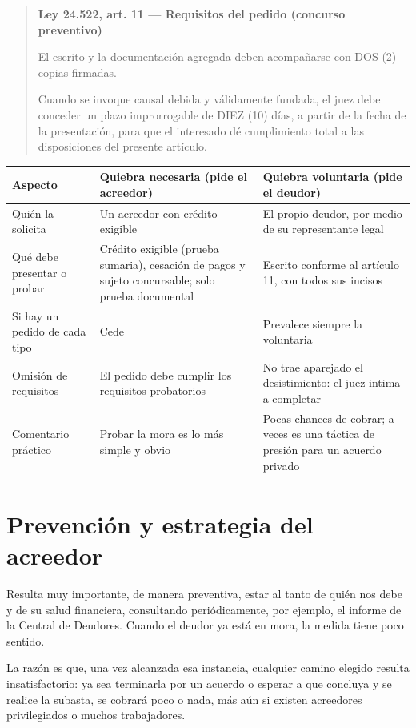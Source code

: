 \documentclass[12pt,oneside]{book}
\newenvironment{articulo}[1]
  {\begin{quote}\small\textbf{#1}\par\smallskip}
  {\end{quote}}
\begin{document}
\begin{articulo}{Ley 24.522, art. 11 --- Requisitos del pedido (concurso preventivo)}
El escrito y la documentación agregada deben acompañarse con DOS (2) copias firmadas.

Cuando se invoque causal debida y válidamente fundada, el juez debe conceder un plazo improrrogable de DIEZ (10) días, a partir de la fecha de la presentación, para que el interesado dé cumplimiento total a las disposiciones del presente artículo.
\end{articulo}

\begin{table}[H]
\centering
\small
\begin{tabularx}{\textwidth}{>{\raggedright\arraybackslash}p{} >{\raggedright\arraybackslash}X >{\raggedright\arraybackslash}X}
\toprule
\textbf{Aspecto} & \textbf{Quiebra necesaria (pide el acreedor)} & \textbf{Quiebra voluntaria (pide el deudor)} \\
\midrule
Quién la solicita & Un acreedor con crédito exigible & El propio deudor, por medio de su representante legal \\
Qué debe presentar o probar & Crédito exigible (prueba sumaria), cesación de pagos y sujeto concursable; solo prueba documental & Escrito conforme al artículo 11, con todos sus incisos \\
Si hay un pedido de cada tipo & Cede & Prevalece siempre la voluntaria \\
Omisión de requisitos & El pedido debe cumplir los requisitos probatorios & No trae aparejado el desistimiento: el juez intima a completar \\
Comentario práctico & Probar la mora es lo más simple y obvio & Pocas chances de cobrar; a veces es una táctica de presión para un acuerdo privado \\
\bottomrule
\end{tabularx}
\end{table}

\section{Prevención y estrategia del acreedor}

Resulta muy importante, de manera preventiva, estar al tanto de quién nos debe y de su salud financiera, consultando periódicamente, por ejemplo, el informe de la Central de Deudores. Cuando el deudor ya está en mora, la medida tiene poco sentido.

La razón es que, una vez alcanzada esa instancia, cualquier camino elegido resulta insatisfactorio: ya sea terminarla por un acuerdo o esperar a que concluya y se realice la subasta, se cobrará poco o nada, más aún si existen acreedores privilegiados o muchos trabajadores.
\end{document}
